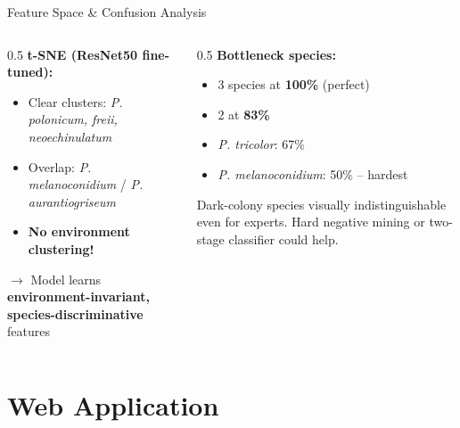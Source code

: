 \documentclass[aspectratio=169]{beamer}
\begin{document}
\begin{frame}{Feature Space \& Confusion Analysis}
  \begin{columns}[T]
    \begin{column}{0.5\textwidth}
      \textbf{t-SNE (ResNet50 fine-tuned):}
      \begin{itemize}
        \item Clear clusters: \textit{P. polonicum, freii, neoechinulatum}
        \item Overlap: \textit{P. melanoconidium} / \textit{P. aurantiogriseum}
        \item \textbf{No environment clustering!}
      \end{itemize}

      $\rightarrow$ Model learns \textbf{environment-invariant, species-discriminative} features
    \end{column}
    \begin{column}{0.5\textwidth}
      \textbf{Bottleneck species:}
      \begin{itemize}
        \item 3 species at \textbf{100\%} (perfect)
        \item 2 at \textbf{83\%}
        \item \textit{P. tricolor}: 67\%
        \item \textit{P. melanoconidium}: 50\% -- hardest
      \end{itemize}

      Dark-colony species visually indistinguishable even for experts. Hard negative mining or two-stage classifier could help.
    \end{column}
  \end{columns}
\end{frame}

\section{Web Application}
\end{document}
